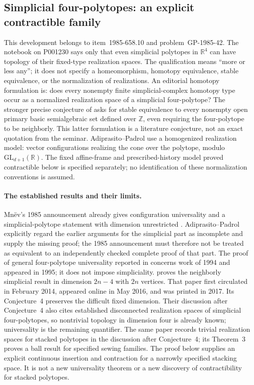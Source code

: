 \subsection{Simplicial four-polytopes: an explicit contractible family}
\label{sec:gy1985-stacking}

This development belongs to item~1985-658.10 and problem~GP-1985-42.
The notebook on P001230 says only that even simplicial polytopes in
\(\mathbb R^4\) can have  topology of their
fixed-type realization spaces. The qualification means ``more or less any'';
it does not specify a homeomorphism, homotopy equivalence, stable equivalence,
or the normalization of realizations. An editorial homotopy formulation is:
does every nonempty finite simplicial-complex homotopy type occur as a
normalized realization space of a simplicial four-polytope? The stronger
precise conjecture of \citet[Conjecture~4]{adiprasitopadrol2017universality}
asks for stable equivalence to every nonempty open primary basic
semialgebraic set defined over \(\mathbb Z\), even requiring the four-polytope
to be neighborly. This latter formulation is a literature conjecture, not
an exact quotation from the seminar. Adiprasito--Padrol use a homogenized
realization model: vector configurations realizing the cone over the
polytope, modulo \(\mathrm{GL}_{d+1}(\mathbb R)\). The fixed affine-frame
and prescribed-history model proved contractible below is specified
separately; no identification of these normalization conventions is
assumed.

\paragraph{The established results and their limits.}
Mn\"ev's 1985 announcement already gives configuration universality and a
simplicial-polytope statement with dimension unrestricted
\citep[Theorems~3--4]{mnev1985varieties}. Adiprasito--Padrol explicitly regard
the earlier arguments for the simplicial part as incomplete and supply
the missing proof; the 1985 announcement must therefore not be treated
as equivalent to an independently checked complete proof of that part. The proof of general four-polytope
universality reported in \citet[Main Theorem]{richtergebertziegler1995realization}
concerns work of 1994 and appeared in 1995; it does not impose simpliciality.
\citet[Theorem~2]{adiprasitopadrol2017universality} proves the neighborly
simplicial result in dimension \(2n-4\) with \(2n\) vertices. That paper first
circulated in February 2014, appeared online in May 2016, and was printed
in 2017. Its Conjecture~4 preserves the difficult fixed dimension.
Their discussion after Conjecture~4 also cites established disconnected
realization spaces of simplicial four-polytopes, so nontrivial topology
in dimension four is already known; universality is the remaining
quantifier. The same paper records trivial realization spaces for stacked polytopes
in the discussion after Conjecture~4; its Theorem~3 proves a ball result
for specified sewing families. The proof below supplies an explicit
continuous insertion and contraction for a narrowly specified stacking
space. It is not a new universality theorem or a new discovery of
contractibility for stacked polytopes.

